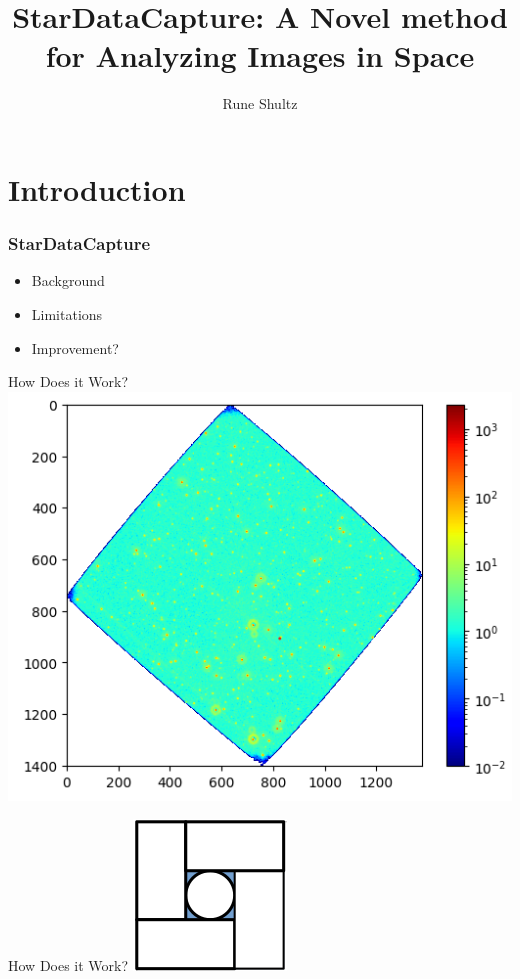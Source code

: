 \documentclass[aspectratio=43]{beamer}
\title[]{StarDataCapture: A Novel method for Analyzing Images in Space}
\institute[]{Institute for Computing in Research, Santa Fe}
\author{Rune Shultz}
\begin{document}
\section{Introduction}
{
\frame{\titlepage}
}

\begin{frame}\Huge
  \frametitle{StarDataCapture}
  \begin{itemize}
      \centering
      \item Background
      \item Limitations
      \item Improvement?
  \end{itemize}
\end{frame}

\begin{frame}{How Does it Work?}
  \centering
  \includegraphics[scale = .5]{starexample.png}
\end{frame}

\begin{frame}{How Does it Work?}
  \centering
  \includegraphics[scale = .75]{circleshape.png}
\end{frame}
\end{document}
